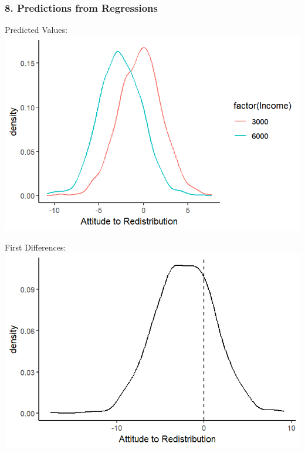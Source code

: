 \documentclass[xcolor=x11names,compress]{beamer}\usepackage[]{graphicx}\usepackage[]{color}
\makeatletter
\def\maxwidth{ %
  \ifdim\Gin@nat@width>\linewidth
    \linewidth
  \else
    \Gin@nat@width
  \fi
}
\newenvironment{knitrout}{}{} %
\renewcommand{\(}{\begin{columns}}
\renewcommand{\)}{\end{columns}}
\newcommand{\<}[1]{\begin{column}{#1}}
\renewcommand{\>}{\end{column}}
\makeatother
\begin{document}
\begin{frame}
\frametitle{8. Predictions from Regressions}
\begin{multicols}{2}
Predicted Values:
\begin{knitrout}
\color{fgcolor}
\includegraphics[width=\maxwidth]{figure/predictions2-1} 

\end{knitrout}
\columnbreak
\pause
First Differences:
\begin{knitrout}
\color{fgcolor}
\includegraphics[width=\maxwidth]{figure/predictions3-1} 

\end{knitrout}
\end{multicols}
\end{frame}
\end{document}
